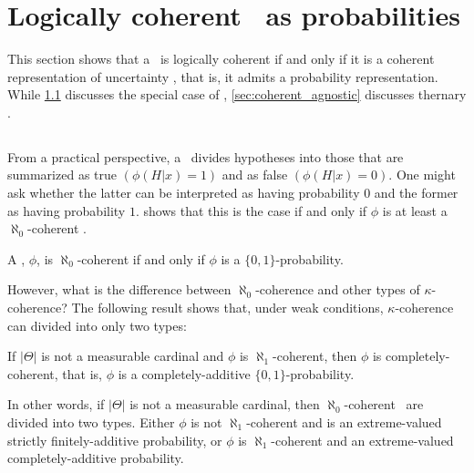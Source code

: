 \section{Logically coherent \summs\ as probabilities}
\label{sec:coh_prob}

This section shows that
a \summ \ is logically coherent if and only if
it is a coherent representation of uncertainty \citep{Finetti1931}, that is,
it admits a probability representation.
While \cref{sec:coherent_standard} 
discusses the special case of 
\stdsumms, \cref{sec:coherent_agnostic} discusses
thernary \summs.

\subsection{\Stdsumms}
\label{sec:coherent_standard}

From a practical perspective,
a \stdsumm \ divides hypotheses
into those that 
are summarized as true $(\phi(H|x) = 1)$
and as false $(\phi(H|x) = 0)$.
One might ask whether
the latter can be interpreted as
having probability $0$ and
the former as having probability $1$.
 shows that
this is the case if and only if
$\phi$ is at least 
a $\aleph_0$-coherent \summ.

\begin{theorem}
 \label{cor:std_prob}
 A \stdsumm, $\phi$, is $\aleph_0$-coherent
 if and only if $\phi$ is
 a $\{0,1\}$-probability.
\end{theorem}

However, what is the difference between
$\aleph_0$-coherence and
other types of $\kappa$-coherence? 
The following result shows that,
under weak conditions,
$\kappa$-coherence can 
divided into only two types:

\begin{theorem}
 \label{thm:coherent_std_1}
 If $|\Theta|$ is not a measurable cardinal
 \citep{Ulam1930} and $\phi$ is $\aleph_1$-coherent, then $\phi$ is completely-coherent, that is, $\phi$ is a completely-additive $\{0,1\}$-probability.
\end{theorem}

In other words,
if $|\Theta|$ is not a measurable cardinal, then
$\aleph_0$-coherent \stdsumms\ are
divided into two types.
Either $\phi$ is not $\aleph_1$-coherent and
is an extreme-valued 
strictly finitely-additive probability, or
$\phi$ is $\aleph_1$-coherent and
an extreme-valued
completely-additive probability.

